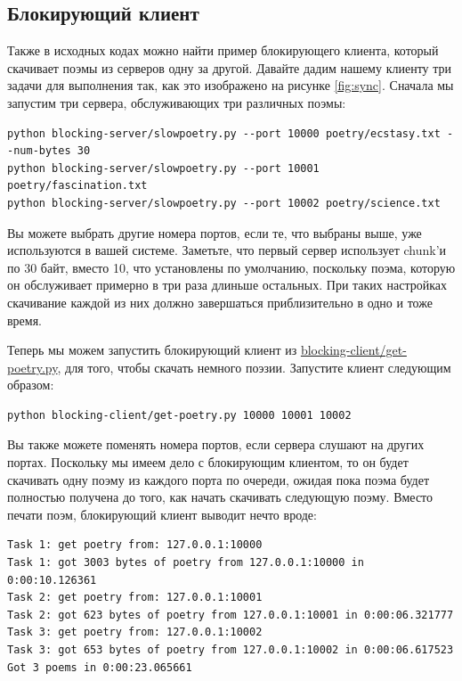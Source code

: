 \subsection{Блокирующий клиент}


    Также в исходных кодах можно найти пример блокирующего 
клиента, который скачивает поэмы из серверов одну за 
другой. Давайте дадим нашему клиенту три задачи для 
выполнения так, как это изображено на рисунке \ref{fig:sync}. 
Сначала мы запустим три сервера, обслуживающих три 
различных поэмы:

\begin{scriptsize}\begin{verbatim}
python blocking-server/slowpoetry.py --port 10000 poetry/ecstasy.txt --num-bytes 30
python blocking-server/slowpoetry.py --port 10001 poetry/fascination.txt
python blocking-server/slowpoetry.py --port 10002 poetry/science.txt
\end{verbatim}\end{scriptsize}


Вы можете выбрать другие номера портов, если те, 
что выбраны выше, уже используются в вашей системе. 
Заметьте, что первый сервер использует chunk'и по 
30 байт, вместо 10, что установлены по умолчанию, 
поскольку поэма, которую он обслуживает  примерно 
в три раза длиньше остальных. При таких настройках 
скачивание каждой из них должно завершаться 
приблизительно в одно и тоже время.


Теперь мы можем запустить блокирующий клиент из 
\href{http://github.com/jdavisp3/twisted-intro/blob/master/blocking-client/get-poetry.py}{blocking-client/get-poetry.py}, 
для того, чтобы скачать немного поэзии. Запустите клиент следующим образом:

\begin{scriptsize}\begin{verbatim}
python blocking-client/get-poetry.py 10000 10001 10002
\end{verbatim}\end{scriptsize}


Вы также можете поменять номера портов, если сервера 
слушают на других портах. Поскольку мы имеем дело с 
блокирующим клиентом, то он будет скачивать одну поэму 
из каждого порта по очереди, ожидая пока поэма будет 
полностью получена до того, как начать скачивать 
следующую поэму. Вместо печати поэм, блокирующий клиент 
выводит нечто вроде: 

\begin{scriptsize}\begin{verbatim}
Task 1: get poetry from: 127.0.0.1:10000
Task 1: got 3003 bytes of poetry from 127.0.0.1:10000 in 0:00:10.126361
Task 2: get poetry from: 127.0.0.1:10001
Task 2: got 623 bytes of poetry from 127.0.0.1:10001 in 0:00:06.321777
Task 3: get poetry from: 127.0.0.1:10002
Task 3: got 653 bytes of poetry from 127.0.0.1:10002 in 0:00:06.617523
Got 3 poems in 0:00:23.065661
\end{verbatim}\end{scriptsize}

